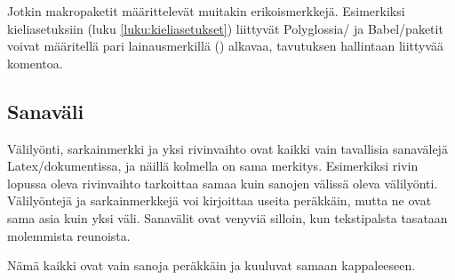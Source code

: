 
Jotkin makropaketit määrittelevät muitakin erikoismerkkejä. Esimerkiksi
kieli\-asetuksiin (luku \ref{luku:kieliasetukset}) liittyvät
Polyglossia\-/{} ja Babel\-/paketit voivat määritellä pari
lainausmerkillä (\koodi{\textquotedbl}) alkavaa, tavutuksen hallintaan
liittyvää komentoa.

\subsection{Sanaväli}

Välilyönti, sarkainmerkki ja yksi rivinvaihto ovat kaikki vain
tavallisia sanavälejä Latex\-/dokumentissa, ja näillä kolmella on sama
merkitys. Esimerkiksi rivin lopussa oleva rivinvaihto tarkoittaa samaa
kuin sanojen välissä oleva välilyönti. Välilyöntejä ja sarkainmerkkejä
voi kirjoittaa useita peräkkäin, mutta ne ovat sama asia kuin yksi väli.
Sanavälit ovat venyviä silloin, kun tekstipalsta tasataan molemmista
reunoista.

\begin{koodilohkosis}
  Nämä      kaikki
       ovat            vain
  sanoja  peräkkäin  ja               kuuluvat
      samaan kappaleeseen.     
\end{koodilohkosis}

